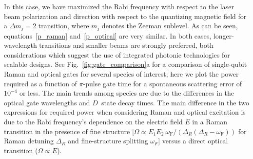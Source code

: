 \documentclass[%
12pt,
 amsmath,amssymb,
]{revtex4-2}
\begin{document}
\noindent In this case, we have maximized the Rabi frequency with respect to the laser beam polarization and direction with respect to the quantizing magnetic field for a $\Delta m_{j} = 2$ transition, where $m_{j}$ denotes the Zeeman sublevel.  As can be seen, equations~\ref{p_raman} and~\ref{p_optical} are very similar.  In both cases, longer-wavelength transitions and smaller beams are strongly preferred, both considerations which suggest the use of integrated photonic technologies for scalable designs.  See Fig.~\ref{fig:gate_comparison}a for a comparison of single-qubit Raman and optical gates for several species of interest; here we plot the power required as a function of $\pi$-pulse gate time for a spontaneous scattering error of $10^{-4}$ or less. The main trends among species are due to the differences in the optical gate wavelengths and $D$~state decay times.  The main difference in the two expressions for required power when considering Raman and optical excitation is due to the Rabi frequency's dependence on the electric field $E$ in a Raman transition in the presence of fine structure [$\Omega \propto E_1 E_2\ \omega_{\textrm{F}} / (\Delta_R(\Delta_R-\omega_{\textrm{F}}))$ for Raman detuning $\Delta_R$ and fine-structure splitting $\omega_{F}$] versus a direct optical transition ($\Omega \propto E$).
\end{document}
